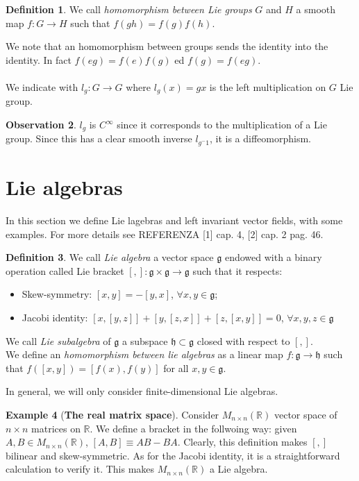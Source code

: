 \documentclass[12pt,a4paper]{report}
\theoremstyle{definition}
\newtheorem{Def}{Definition}[chapter]
\theoremstyle{Theorem}
\theoremstyle{definition}
\newtheorem{Ex}[Def]{Example}
\theoremstyle{definition}
\newtheorem{Obs}[Def]{Observation}
\begin{document}
		\begin{Def}
			We call \textit{homomorphism between Lie groups} $G$ and $H$ a smooth map $f:G\rightarrow H$ such that $f(gh)=f(g)f(h)$.
		\end{Def}
		We note that an homomorphism between groups sends the identity into the identity. In fact $f(eg)=f(e)f(g)$ ed $f(g)=f(eg)$.\\\\
		We indicate with $l_g:G\rightarrow G$ where $l_g(x)=gx$ is the left multiplication on $G$ Lie group.
		\begin{Obs}
			$l_g$ is $C^\infty$ since it corresponds to the multiplication of a Lie group. Since this has a clear smooth inverse $l_{g^-1}$, it is a diffeomorphism.
		\end{Obs}
		\section{Lie algebras}
		In this section we define Lie lagebras and left invariant vector fields, with some examples. For more details see REFERENZA [1] cap. 4, [2] cap. 2 pag. 46.
		\begin{Def}
			We call \textit{Lie algebra} a vector space $\mathfrak{g}$ endowed with a binary operation called Lie bracket $[,]:\mathfrak{g}\times\mathfrak{g}\rightarrow\mathfrak{g}$ such that it respects:
			\begin{itemize}
				\item Skew-symmetry: $[x,y]=-[y,x]$, $\forall x,y\in\mathfrak{g}$;
				\item Jacobi identity: $[x,[y,z]]+[y,[z,x]]+[z,[x,y]]=0$, $\forall x,y,z\in \mathfrak{g}$ 
			\end{itemize}
			We call \textit{Lie subalgebra} of $\mathfrak{g}$ a subspace $\mathfrak{h}\subset\mathfrak{g}$ closed with respect to $[,]$.\\
			We define an \textit{homomorphism between lie algebras} as a linear map $f:\mathfrak{g}\rightarrow\mathfrak{h}$ such that $f([x,y])=[f(x),f(y)]$ for all $x,y\in\mathfrak{g}$.
		\end{Def}
		In general, we will only consider finite-dimensional Lie algebras.
		\begin{Ex} [\textbf{The real matrix space}]\label{Obs: bracket Mnn}
			Consider $M_{n\times n}(\mathbb{R})$ vector space of $n\times n$ matrices on $\mathbb{R}$. We define a bracket in the follwoing way: given $A,B\in M_{n\times n}(\mathbb{R})$, $[A,B]\equiv AB-BA$. Clearly, this definition makes $[,]$ bilinear and skew-symmetric. As for the Jacobi identity, it is a straightforward calculation to verify it. This makes $M_{n\times n}(\mathbb{R})$ a Lie algebra. 
		\end{Ex}
\end{document}
